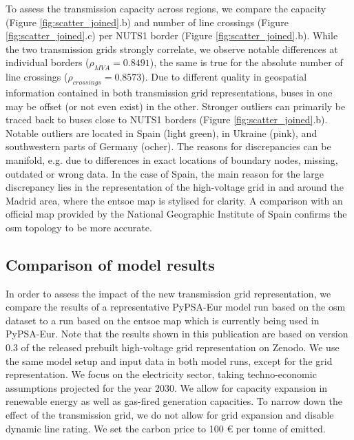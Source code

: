 \documentclass[fleqn,10pt]{wlscirep}
\let\autocite\cite
\begin{document}
To assess the transmission capacity across regions, we compare the capacity (Figure \ref{fig:scatter_joined}.b) and number of line crossings (Figure \ref{fig:scatter_joined}.c) per NUTS1 border (Figure \ref{fig:scatter_joined}.b). While the two transmission grids strongly correlate, we observe notable differences at individual borders ($\rho_{MVA} = 0.8491$), the same is true for the absolute number of line crossings ($\rho_{crossings} = 0.8573$). Due to different quality in geospatial information contained in both transmission grid representations, buses in one may be offset (or not even exist) in the other. Stronger outliers can primarily be traced back to buses close to NUTS1 borders (Figure \ref{fig:scatter_joined}.b). Notable outliers are located in Spain (light green), in Ukraine (pink), and southwestern parts of Germany (ocher). The reasons for discrepancies can be manifold, e.g. due to differences in exact locations of boundary nodes, missing, outdated or wrong data. In the case of Spain, the main reason for the large discrepancy lies in the representation of the high-voltage grid in and around the Madrid area, where the \acrshort{entsoe} map is stylised for clarity. A comparison with an official map provided by the National Geographic Institute of Spain\autocite{institutogeograficonacionalEnergiaMapaRed2016} confirms the \gls{osm} topology to be more accurate.

\subsection*{Comparison of model results}
In order to assess the impact of the new transmission grid representation, we compare the results of a representative PyPSA-Eur model run based on the \gls{osm} dataset to a run based on the \acrshort{entsoe} map which is currently being used in PyPSA-Eur. \autocite{horschPyPSAEurOpenOptimisation2018} Note that the results shown in this publication are based on version 0.3 of the released prebuilt high-voltage grid representation on Zenodo.\autocite{xiongPrebuiltElectricityNetwork2024} We use the same model setup and input data in both model runs, except for the grid representation. We focus on the electricity sector, taking techno-economic assumptions projected for the year 2030. We allow for capacity expansion in renewable energy as well as gas-fired generation capacities. To narrow down the effect of the transmission grid, we do not allow for grid expansion and disable dynamic line rating. We set the carbon price to 100 \euro{} per tonne of  emitted.
\end{document}
